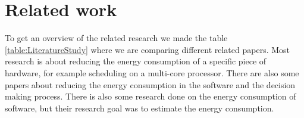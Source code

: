 \chapter{Related work}
\label{ch:related_work}

To get an overview of the related research we made the table \ref{table:LiteratureStudy} where we are comparing different related papers. Most research is about reducing the energy consumption of a specific piece of hardware, for example scheduling on a multi-core processor. There are also some papers about reducing the energy consumption in the software and the decision making process. There is also some research done on the energy consumption of software, but their research goal was to estimate the energy consumption. 

